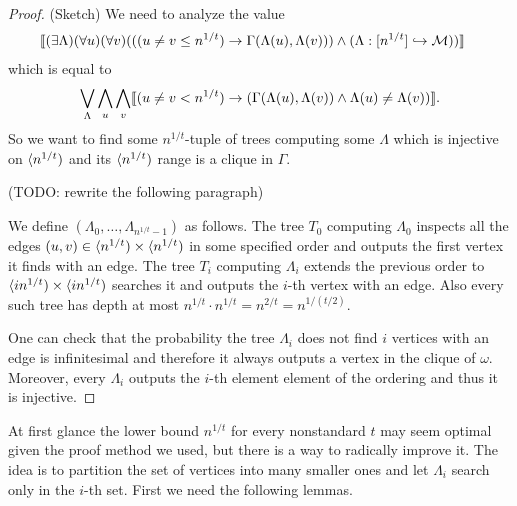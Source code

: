 \begin{proof}(Sketch) We need to analyze the value
\begin{align}
&\llbracket(\exists \Lambda)(\forall u)(\forall v)(((u\not = v \leq n^{1/t})\to\Gamma(\Lambda(u),\Lambda(v)))\land(\Lambda:[n^{1/t}]\hookrightarrow\mathcal{M}))\rrbracket
\end{align}
which is equal to
\begin{align}
\bigvee_\Lambda\bigwedge_u\bigwedge_v\llbracket(u\not=v < n^{1/t})\to(\Gamma(\Lambda(u),\Lambda(v))\land\Lambda(u)\not=\Lambda(v))\rrbracket.
\end{align}
So we want to find some $n^{1/t}$-tuple of trees computing some $\Lambda$ which is injective on $\langle n^{1/t})$ and its $\langle n^{1/t})$ range is a clique in $\Gamma$.

(TODO: rewrite the following paragraph)

We define $(\Lambda_0,\dots,\Lambda_{n^{1/t}-1})$ as follows. The tree $T_0$ computing $\Lambda_0$ inspects all the edges $(u,v)\in\langle n^{1/t})\times\langle n^{1/t})$ in some specified order and outputs the first vertex it finds with an edge. The tree $T_i$ computing $\Lambda_i$ extends the previous order to $\langle in^{1/t})\times\langle in^{1/t})$ searches it and outputs the $i$-th vertex with an edge. Also every such tree has depth at most $n^{1/t}\cdot n^{1/t}=n^{2/t}=n^{1/(t/2)}$.

One can check that the probability the tree $\Lambda_i$ does not find $i$ vertices with an edge is infinitesimal and therefore it always outputs a vertex in the clique of $\omega$. Moreover, every $\Lambda_i$ outputs the $i$-th element element of the ordering and thus it is injective.
\end{proof}

At first glance the lower bound $n^{1/t}$ for every nonstandard $t$ may seem optimal given the proof method we used, but there is a way to radically improve it. The idea is to partition the set of vertices into many smaller ones and let $\Lambda_i$ search only in the $i$-th set. First we need the following lemmas.

